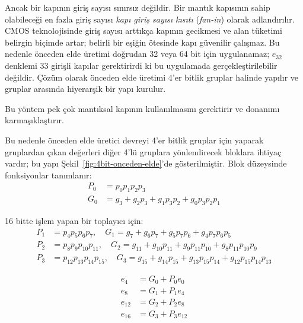 Ancak bir kapının giriş sayısı sınırsız değildir. Bir mantık kapısının sahip olabileceği en fazla giriş sayısı \emph{kapı giriş sayısı kısıtı} (\emph{fan-in}) olarak adlandırılır. CMOS teknolojisinde giriş sayısı arttıkça kapının gecikmesi ve alan tüketimi belirgin biçimde artar; belirli bir eşiğin ötesinde kapı güvenilir çalışmaz. Bu nedenle önceden elde üretimi doğrudan 32 veya 64 bit için uygulanamaz; $e_{32}$ denklemi 33 girişli kapılar gerektirirdi ki bu uygulamada gerçekleştirilebilir değildir. Çözüm olarak önceden elde üretimi 4'er bitlik gruplar halinde yapılır ve gruplar arasında hiyerarşik bir yapı kurulur.

Bu yöntem pek çok mantıksal kapının kullanılmasını gerektirir ve donanımı karmaşıklaştırır.

Bu nedenle önceden elde üretici devreyi 4'er bitlik gruplar için yaparak gruplardan çıkan değerleri diğer 4'lü gruplara yönlendirecek bloklara ihtiyaç vardır; bu yapı Şekil~\ref{fig:4bit-onceden-elde}'de gösterilmiştir. Blok düzeysinde fonksiyonlar tanımlanır:
\begin{align}
P_0 &= p_0 p_1 p_2 p_3 \\
G_0 &= g_3 + g_2 p_3 + g_1 p_3 p_2 + g_0 p_3 p_2 p_1
\end{align}

16 bitte işlem yapan bir toplayıcı için:
\begin{align}
P_1 &= p_4 p_5 p_6 p_7, \quad G_1 = g_7 + g_6 p_7 + g_5 p_7 p_6 + g_4 p_7 p_6 p_5 \\
P_2 &= p_8 p_9 p_{10} p_{11}, \quad G_2 = g_{11} + g_{10} p_{11} + g_9 p_{11} p_{10} + g_8 p_{11} p_{10} p_9 \\
P_3 &= p_{12} p_{13} p_{14} p_{15}, \quad G_3 = g_{15} + g_{14} p_{15} + g_{13} p_{15} p_{14} + g_{12} p_{15} p_{14} p_{13}
\end{align}

\begin{align}
e_4 &= G_0 + P_0 e_0 \\
e_8 &= G_1 + P_1 e_4 \\
e_{12} &= G_2 + P_2 e_8 \\
e_{16} &= G_3 + P_3 e_{12}
\end{align}

